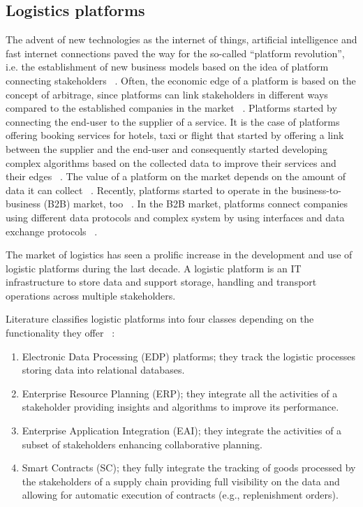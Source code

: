 \subsection{Logistics platforms} \label{secLogPlatform}
The advent of new technologies as the internet of things, artificial intelligence and fast internet connections paved the way for the so-called “platform revolution”, i.e. the establishment of new business models based on the idea of platform connecting stakeholders ~\cite{Nambisan2019}. Often, the economic edge of a platform is based on the concept of arbitrage, since platforms can link stakeholders in different ways compared to the established companies in the market ~\cite{Dana2003,Kenney2016}. Platforms started by connecting the end-user to the supplier of a service. It is the case of platforms offering booking services for hotels, taxi or flight that started by offering a link between the supplier and the end-user and consequently started developing complex algorithms based on the collected data to improve their services and their edges ~\cite{Benjaafar2019, Guda2019}. The value of a platform on the market depends on the amount of data it can collect ~\cite{Guda2019}. Recently, platforms started to operate in the business-to-business (B2B) market, too ~\cite{Huang2013}.  In the B2B market, platforms connect companies using different data protocols and complex system by using interfaces and data exchange protocols ~\cite{Yu2007}. \par

The market of logistics has seen a prolific increase in the development and use of logistic platforms during the last decade. A logistic platform is an IT infrastructure to store data and support storage, handling and transport operations across multiple stakeholders.\par

Literature classifies logistic platforms into four classes depending on the functionality they offer ~\cite{Xiu2010}:

\begin{enumerate}
    \item Electronic Data Processing (EDP) platforms; they track the logistic processes storing data into relational databases.
    \item Enterprise Resource Planning (ERP); they integrate all the activities of a stakeholder providing insights and algorithms to improve its performance.
    \item Enterprise Application Integration (EAI); they integrate the activities of a subset of stakeholders enhancing collaborative planning.
    \item Smart Contracts (SC); they fully integrate the tracking of goods processed by the stakeholders of a supply chain providing full visibility on the data and allowing for automatic execution of contracts (e.g., replenishment orders).

\end{enumerate}

